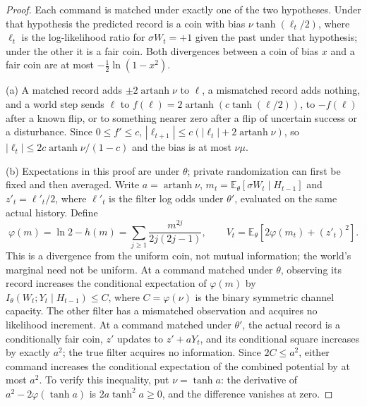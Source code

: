 \documentclass[11pt,a4paper]{article}
\newcommand{\E}{\mathbb E}
\newcommand{\artanh}{\operatorname{artanh}}
\begin{document}
\begin{proof}
Each command is matched under exactly one of the two hypotheses. Under that hypothesis the predicted record is a coin with bias $\nu\tanh(\ell_t/2)$, where $\ell_t$ is the log-likelihood ratio for $\sigma W_t=+1$ given the past under that hypothesis; under the other it is a fair coin. Both divergences between a coin of bias $x$ and a fair coin are at most $-\frac12\ln(1-x^2)$.

(a) A matched record adds $\pm2\artanh\nu$ to $\ell$, a mismatched record adds nothing, and a world step sends $\ell$ to $f(\ell)=2\artanh(c\tanh(\ell/2))$, to $-f(\ell)$ after a known flip, or to something nearer zero after a flip of uncertain success or a disturbance. Since $0\le f'\le c$, $|\ell_{t+1}|\le c(|\ell_t|+2\artanh\nu)$, so $|\ell_t|\le2c\artanh\nu/(1-c)$ and the bias is at most $\nu\mu$.

(b) Expectations in this proof are under $\theta$; private randomization can first be fixed and then averaged. Write $a=\artanh\nu$, $m_t=\E_\theta[\sigma W_t\mid H_{t-1}]$ and $z'_t=\ell'_t/2$, where $\ell'_t$ is the filter log odds under $\theta'$, evaluated on the same actual history. Define
\[
 \varphi(m)=\ln2-h(m)=\sum_{j\ge1}\frac{m^{2j}}{2j(2j-1)},\qquad
 V_t=\E_\theta[2\varphi(m_t)+(z'_t)^2].
\]
This is a divergence from the uniform coin, not mutual information; the world's marginal need not be uniform. At a command matched under $\theta$, observing its record increases the conditional expectation of $\varphi(m)$ by $I_\theta(W_t;Y_t\mid H_{t-1})\le C$, where $C=\varphi(\nu)$ is the binary symmetric channel capacity. The other filter has a mismatched observation and acquires no likelihood increment. At a command matched under $\theta'$, the actual record is a conditionally fair coin, $z'$ updates to $z'+aY_t$, and its conditional square increases by exactly $a^2$; the true filter acquires no information. Since $2C\le a^2$, either command increases the conditional expectation of the combined potential by at most $a^2$. To verify this inequality, put $\nu=\tanh a$: the derivative of $a^2-2\varphi(\tanh a)$ is $2a\tanh^2a\ge0$, and the difference vanishes at zero.


\end{proof}
\end{document}
